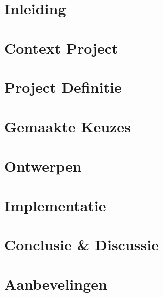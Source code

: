 \documentclass{../local}
\begin{document}
\newpage{}
\renewcommand{\thesection}{\arabic{section}}
\setlength{\cftbeforetoctitleskip}{-3em}
\tableofcontents

\clearpage

\chapter{Inleiding}


\chapter{Context Project} 


\chapter{Project Definitie}


\chapter{Gemaakte Keuzes}


\chapter{Ontwerpen}


\chapter{Implementatie}


\chapter{Conclusie \& Discussie}


\chapter{Aanbevelingen}






\end{document}
